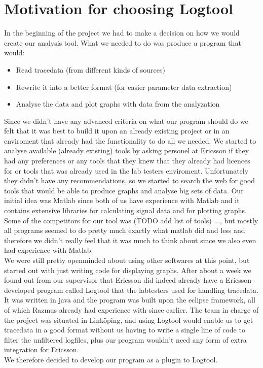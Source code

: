 \documentclass[cropmarks, frame, english]{idamasterthesis}
\begin{document}
\section{Motivation for choosing Logtool}
In the beginning of the project we had to make a decision on how we would create our analysis tool.
What we needed to do was produce a program that would:
\begin{itemize}
\item Read tracedata (from different kinds of sources)
\item Rewrite it into a better format (for easier parameter data extraction)
\item  Analyse the data and plot graphs with data from the analyzation
\end{itemize} 
Since we didn't have any advanced criteria on what our program should do we felt that it was best to build it upon an already existing project or in an enviroment that already had the functionality to do all we needed. \newline
We started to analyse available (already existing) tools by asking personel at Ericsson if they had any preferences or any tools that they knew that they already had licences for or tools that was already used in the lab testers enviroment. Unfortunately they didn't have any recommendations, so we started to search the web for good tools that would be able to produce graphs and analyse big sets of data. Our initial idea was Matlab since both of us have experience with Matlab and it contains extensive libraries for calculating signal data and for plotting graphs. Some of the competitors for our tool was (TODO add list of tools) ..., but mostly all programs seemed to do pretty much exactly what matlab did and less and therefore we didn't really feel that it was much to think about since we also even had experience with Matlab. \\
We were still pretty openminded about using other softwares at this point, but started out with just writing code for displaying graphs. After about a week we found out from our supervisor that Ericsson did indeed already have a Ericsson-developed program called Logtool that the labtesters used for handling tracedata. It was written in java and the program was built upon the eclipse framework, all of which Razmus already had experience with since earlier. The team in charge of the project was situated in Linköping, and using Logtool would enable us to get tracedata in a good format without us having to write a single line of code to filter the unfiltered logfiles, plus our program wouldn't need any form of extra integration for Ericsson.\\
We therefore decided to develop our program as a plugin to Logtool. 
\end{document}
